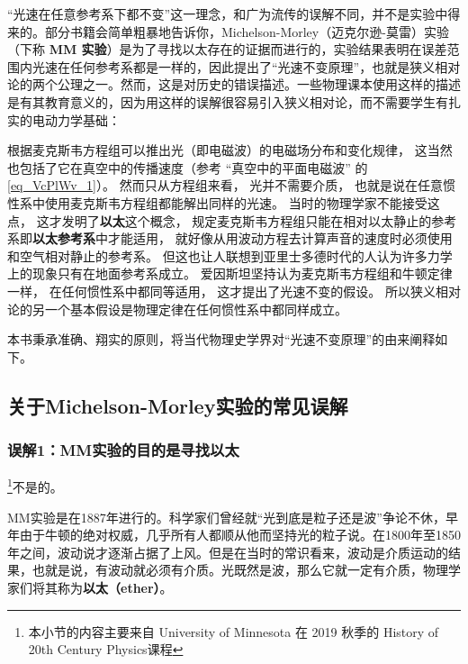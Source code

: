 

“光速在任意参考系下都不变”这一理念，和广为流传的误解不同，并不是实验中得来的。部分书籍会简单粗暴地告诉你，Michelson-Morley（迈克尔逊-莫雷）实验（下称 \textbf{MM 实验}）是为了寻找以太存在的证据而进行的，实验结果表明在误差范围内光速在任何参考系都是一样的，因此提出了“光速不变原理”，也就是狭义相对论的两个公理之一。然而，这是对历史的错误描述。一些物理课本使用这样的描述是有其教育意义的，因为用这样的误解很容易引入狭义相对论，而不需要学生有扎实的电动力学基础：

根据麦克斯韦方程组可以推出光（即电磁波）的电磁场分布和变化规律， 这当然也包括了它在真空中的传播速度（参考 “真空中的平面电磁波” 的 \autoref{eq_VcPlWv_1}）。 然而只从方程组来看， 光并不需要介质， 也就是说在任意惯性系中使用麦克斯韦方程组都能解出同样的光速。 当时的物理学家不能接受这点， 这才发明了\textbf{以太}这个概念， 规定麦克斯韦方程组只能在相对以太静止的参考系即\textbf{以太参考系}中才能适用， 就好像从用波动方程去计算声音的速度时必须使用和空气相对静止的参考系。 但这也让人联想到亚里士多德时代的人认为许多力学上的现象只有在地面参考系成立。 爱因斯坦坚持认为麦克斯韦方程组和牛顿定律一样， 在任何惯性系中都同等适用， 这才提出了光速不变的假设。 所以狭义相对论的另一个基本假设是物理定律在任何惯性系中都同样成立。

本书秉承准确、翔实的原则，将当代物理史学界对“光速不变原理”的由来阐释如下。

\subsection{关于Michelson-Morley实验的常见误解}

\subsubsection{误解1：MM实验的目的是寻找以太}

\footnote{本小节的内容主要来自 University of Minnesota 在 2019 秋季的 History of 20th Century Physics课程}不是的。

MM实验是在1887年进行的。科学家们曾经就“光到底是粒子还是波”争论不休，早年由于牛顿的绝对权威，几乎所有人都顺从他而坚持光的粒子说。在1800年至1850年之间，波动说才逐渐占据了上风。但是在当时的常识看来，波动是介质运动的结果，也就是说，有波动就必须有介质。光既然是波，那么它就一定有介质，物理学家们将其称为\textbf{以太（ether）}。

